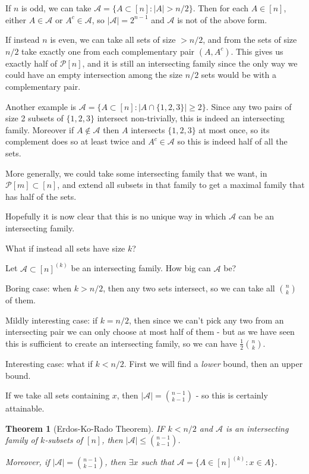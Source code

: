 \documentclass[]{article}
\theoremstyle{custhm}
\theoremstyle{cusdef}
\theoremstyle{custhm}
\theoremstyle{custhm}
\theoremstyle{custhm}
\theoremstyle{custhm}
\newtheorem*{theorem*}{Theorem}
\theoremstyle{cusdef}
\theoremstyle{remark}
\renewcommand{\it}[1]{\textit{#1}}
\newcommand{\A}{\mathcal{A}}
\begin{document}
If $n$ is odd, we can take $\A = \{A\subset [n]:|A| > n/2\}$. Then for each $A\in [n]$, either $A\in \A$ or $A^c \in \A$, so $|\A| = 2^{n-1}$ and $\A$ is not of the above form.

If instead $n$ is even, we can take all sets of size $ > n/2$, and from the sets of size $n/2$ take exactly one from each complementary pair $(A,A^c)$. This gives us exactly half of $\mathcal{P}[n]$, and it is still an intersecting family since the only way we could have an empty intersection among the size $n/2$ sets would be with a complementary pair.

Another example is $\A = \{A\subset [n] : |A\cap\{1,2,3\}|\ge 2\}$. Since any two pairs of size 2 subsets of $\{1,2,3\}$ intersect non-trivially, this is indeed an intersecting family. Moreover if $A\not\in\A$ then $A$ intersects $\{1,2,3\}$ at most once, so its complement does so at least twice and $A^c\in\A$ so this is indeed half of all the sets.

More generally, we could take some intersecting family that we want, in $\mathcal{P}[m]\subset[n]$, and extend all subsets in that family to get a maximal family that has half of the sets.

Hopefully it is now clear that this is no unique way in which $\A$ can be an intersecting family.

What if instead all sets have size $k$?

Let $\A\subset [n]^{(k)}$ be an intersecting family. How big can $\A$ be?

Boring case: when $k > n/2$, then any two sets intersect, so we can take all ${n \choose k}$ of them.

Mildly interesting case: if $k = n/2$, then since we can't pick any two from an intersecting pair we can only choose at most half of them - but as we have seen this is sufficient to create an intersecting family, so we can have $\frac{1}{2}{n\choose k}$.

Interesting case: what if $k < n/2$. First we will find a \it{lower} bound, then an upper bound.

If we take all sets containing $x$, then $|\A| = {n-1\choose k-1}$ - so this is certainly attainable.

\begin{theorem*}[Erdos-Ko-Rado Theorem]
IF $k < n/2$ and $\A$ is an intersecting family of $k$-subsets of $[n]$, then $|\A| \le {n-1\choose k-1}$.

Moreover, if $|\A| = {n-1 \choose k-1}$, then $\exists x$ such that $\A = \{A\in [n]^{(k)}:x\in A\}$.
\end{theorem*}
\end{document}
